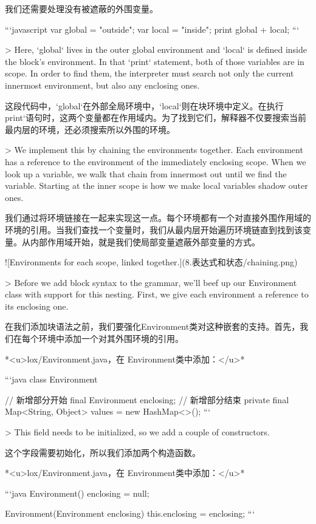 \documentclass[cn,11pt,chinese]{elegantbook}
\begin{document}
{{{{{我们还需要处理没有被遮蔽的外围变量。

```javascript
var global = "outside";
{
  var local = "inside";
  print global + local;
}
```

> Here, `global` lives in the outer global environment and `local` is defined inside the block’s environment. In that `print` statement, both of those variables are in scope. In order to find them, the interpreter must search not only the current innermost environment, but also any enclosing ones.

这段代码中，`global`在外部全局环境中，`local`则在块环境中定义。在执行print`语句时，这两个变量都在作用域内。为了找到它们，解释器不仅要搜索当前最内层的环境，还必须搜索所以外围的环境。

> We implement this by chaining the environments together. Each environment has a reference to the environment of the immediately enclosing scope. When we look up a variable, we walk that chain from innermost out until we find the variable. Starting at the inner scope is how we make local variables shadow outer ones.

我们通过将环境链接在一起来实现这一点。每个环境都有一个对直接外围作用域的环境的引用。当我们查找一个变量时，我们从最内层开始遍历环境链直到找到该变量。从内部作用域开始，就是我们使局部变量遮蔽外部变量的方式。

![Environments for each scope, linked together.](8.表达式和状态/chaining.png)


> Before we add block syntax to the grammar, we’ll beef up our Environment class with support for this nesting. First, we give each environment a reference to its enclosing one.

在我们添加块语法之前，我们要强化Environment类对这种嵌套的支持。首先，我们在每个环境中添加一个对其外围环境的引用。

*<u>lox/Environment.java，在 Environment类中添加：</u>*

```java
class Environment {
  // 新增部分开始
  final Environment enclosing;
  // 新增部分结束
  private final Map<String, Object> values = new HashMap<>();
```

> This field needs to be initialized, so we add a couple of constructors.

这个字段需要初始化，所以我们添加两个构造函数。

*<u>lox/Environment.java，在 Environment类中添加：</u>*

```java
  Environment() {
    enclosing = null;
  }

  Environment(Environment enclosing) {
    this.enclosing = enclosing;
  }
```

}}}}}}
\end{document}
